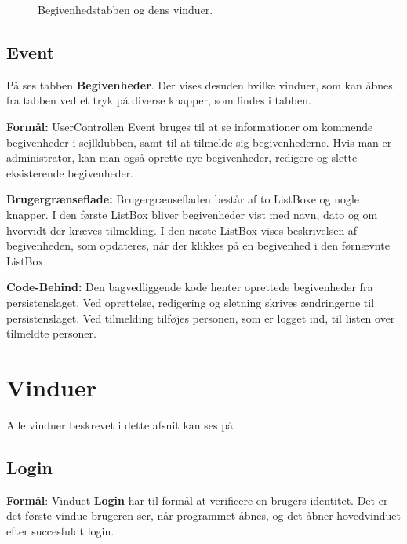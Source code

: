\begin{center}
    \begin{figure}[H]
        \caption{Begivenhedstabben og dens vinduer.}
        \label{img:begivenhed}
        \vspace{-40pt}
    \end{figure}
\end{center}



\subsection{Event}

På  ses tabben \textbf{Begivenheder}. 
Der vises desuden hvilke vinduer, som kan åbnes fra tabben ved et tryk på diverse knapper, som findes i tabben.

\textbf{Formål:}
UserControllen Event bruges til at se informationer om kommende begivenheder i sejlklubben, samt til at tilmelde sig begivenhederne. 
Hvis man er administrator, kan man også oprette nye begivenheder, redigere og slette eksisterende begivenheder.

\textbf{Brugergrænseflade:}
Brugergrænsefladen består af to ListBoxe og nogle knapper.
I den første ListBox bliver begivenheder vist med navn, dato og om hvorvidt der kræves tilmelding.
I den næste ListBox vises beskrivelsen af begivenheden, som opdateres, når der klikkes på en begivenhed i den førnævnte ListBox. 

\textbf{Code-Behind:}
Den bagvedliggende kode henter oprettede begivenheder fra persistenslaget. 
Ved oprettelse, redigering og sletning skrives ændringerne til persistenslaget. 
Ved tilmelding tilføjes personen, som er logget ind, til listen over tilmeldte personer.

\newpage

\section{Vinduer}
Alle vinduer beskrevet i dette afsnit kan ses på . 
\subsection{Login}
 
\textbf{Formål}:
Vinduet \textbf{Login} har til formål at verificere en brugers identitet. 
Det er det første vindue brugeren ser, når programmet åbnes, og det åbner hovedvinduet efter succesfuldt login.
 

